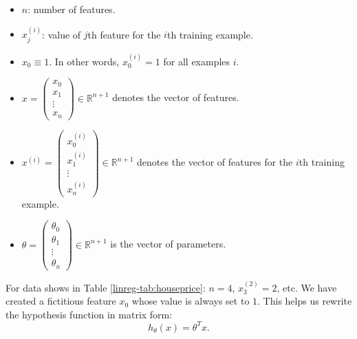 \documentclass{article}
\theoremstyle{definition}
\begin{document}
\begin{itemize}
    \item $n$: number of features.
    
    \item $x^{(i)}_{j}$: value of $j$th feature for the $i$th training example.
    
    \item $x_0 \equiv 1$. In other words, $x^{(i)}_0 = 1$ for all examples $i$.

    \item $x=
        \begin{pmatrix}
            x_0 \\
            x_1 \\
            \vdots \\
            x_n
        \end{pmatrix}
        \in \mathbb{R}^{n+1}
    $ denotes the vector of features.

    \item $x^{(i)}=
        \begin{pmatrix}
            x^{(i)}_0 \\
            x^{(i)}_1 \\
            \vdots \\
            x^{(i)}_n
        \end{pmatrix}
        \in \mathbb{R}^{n+1}
    $ denotes the vector of features for the $i$th training example. 

    \item $\theta =
        \begin{pmatrix}
            \theta_0 \\
            \theta_1 \\ 
            \vdots \\
            \theta_n
        \end{pmatrix}
        \in \mathbb{R}^{n+1}
    $ is the vector of parameters.
\end{itemize}
For data shows in Table \ref{linreg-tab:houseprice}: $n=4$, $x^{(2)}_3=2$, etc. 
We have created a fictitious feature $x_0$ whose value is always set to $1$. This helps us rewrite the hypothesis function in matrix form:
\begin{equation}
    h_{\theta}(x) = \theta^Tx.
    \label{linreg-eq:multi-hypothesis-mat}
\end{equation}


\end{document}
